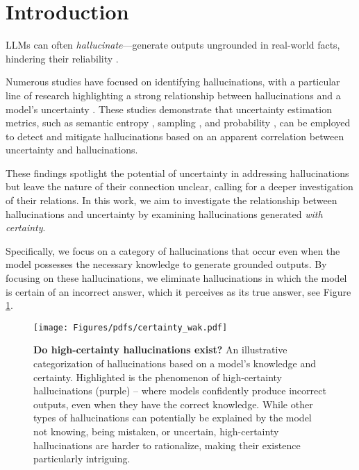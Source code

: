 


\section{Introduction}
LLMs can often \emph{hallucinate}---generate outputs ungrounded in real-world facts, hindering their reliability \citep{survey_of_hallucination_in_natural_language_generation, Towards_understanding_sycophancy_in_language_models, Calibrated_language_models_must_hallucinate}. 

Numerous studies have focused on identifying hallucinations, with a particular line of research highlighting a strong relationship between hallucinations and a model's uncertainty \citep{tjandra2024fine,SelfCheckGPT}.
These studies demonstrate that uncertainty estimation metrics, such as semantic entropy \citep{kuhn2023semantic}, sampling \citep{cole-etal-2023-selectively}, and probability \citep{feng2024don}, can be employed to detect and mitigate hallucinations based on an apparent correlation between uncertainty and hallucinations.




These findings spotlight the potential of uncertainty in addressing hallucinations but leave the nature of their connection unclear, calling for a deeper investigation of their relations.
In this work, we aim to investigate the relationship between hallucinations and uncertainty by examining hallucinations generated \emph{with certainty}.

Specifically, we focus on a category of hallucinations that occur even when the model possesses the necessary knowledge to generate grounded outputs. By focusing on these hallucinations, we eliminate hallucinations in which the model is certain of an incorrect answer, which it perceives as its true answer, see Figure \ref{fig:chk_certain}.


\begin{figure}
\centering
  \centering

\texttt{[image: Figures/pdfs/certainty\_wak.pdf]}
\caption{\textbf{Do high-certainty hallucinations exist?} An illustrative categorization of hallucinations based on a model's knowledge and certainty. Highlighted is the phenomenon of high-certainty hallucinations (purple) -- where models confidently produce incorrect outputs, even when they have the correct knowledge. While other types of hallucinations can potentially be explained by the model not knowing, being mistaken, or uncertain, high-certainty hallucinations are harder to rationalize, making their existence particularly intriguing.}
\label{fig:chk_certain}
\end{figure}


